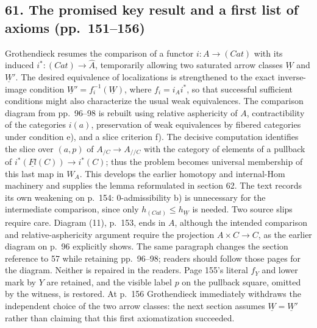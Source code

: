 \subsection*{61. The promised key result and a first list of axioms (pp.~151--156)}
Grothendieck resumes the comparison of a functor $i:A\to(Cat)$ with its induced $i^*:(Cat)\to\widehat A$, temporarily allowing two saturated arrow classes $\underline W$ and $\underline W'$. The desired equivalence of localizations is strengthened to the exact inverse-image condition $\underline W'=f_i^{-1}(\underline W)$, where $f_i=i_Ai^*$, so that successful sufficient conditions might also characterize the usual weak equivalences. The comparison diagram from pp.~96--98 is rebuilt using relative asphericity of $A$, contractibility of the categories $i(a)$, preservation of weak equivalences by fibered categories under condition e), and a slice criterion f). The decisive computation identifies the slice over $(a,p)$ of $A_{/C}\to A_{//C}$ with the category of elements of a pullback of $i^*(\underline{Fl}(C))\to i^*(C)$; thus the problem becomes universal membership of this last map in $W_A$. This develops the earlier homotopy and internal-Hom machinery and supplies the lemma reformulated in section 62. The text records its own weakening on p.~154: 0-admissibility b) is unnecessary for the intermediate comparison, since only $h_{(Cat)}\leq h_{\underline W}$ is needed. Two source slips require care. Diagram (11), p.~153, ends in $A$, although the intended comparison and relative-asphericity argument require the projection $A\times C\to C$, as the earlier diagram on p.~96 explicitly shows. The same paragraph changes the section reference to 57 while retaining pp.~96--98; readers should follow those pages for the diagram. Neither is repaired in the readers. Page 155's literal $f_Y$ and lower mark by $Y$ are retained, and the visible label $p$ on the pullback square, omitted by the witness, is restored. At p.~156 Grothendieck immediately withdraws the independent choice of the two arrow classes: the next section assumes $\underline W=\underline W'$ rather than claiming that this first axiomatization succeeded.

